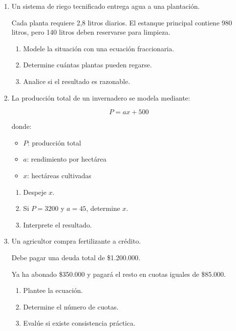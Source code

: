 \documentclass[12pt]{article}
\begin{document}
	\begin{enumerate}[label=\textbf{\arabic*.}, start=12]
		
		\item Un sistema de riego tecnificado entrega agua a una plantación.
		
		Cada planta requiere 2,8 litros diarios.
		El estanque principal contiene 980 litros,
		pero 140 litros deben reservarse para limpieza.
		
		\begin{enumerate}[label=\alph*)]
			\item Modele la situación con una ecuación fraccionaria.
			\item Determine cuántas plantas pueden regarse.
			\item Analice si el resultado es razonable.
		\end{enumerate}
		
		
		\item La producción total de un invernadero se modela mediante:
		
		\[
		P = ax + 500
		\]
		
		donde:
		
		\begin{itemize}
			\item \(P\): producción total
			\item \(a\): rendimiento por hectárea
			\item \(x\): hectáreas cultivadas
		\end{itemize}
		
		\begin{enumerate}[label=\alph*)]
			\item Despeje \(x\).
			\item Si \(P=3200\) y \(a=45\), determine \(x\).
			\item Interprete el resultado.
		\end{enumerate}
		
		
		\item Un agricultor compra fertilizante a crédito.
		
		Debe pagar una deuda total de \$1.200.000.
		
		Ya ha abonado \$350.000 y pagará
		el resto en cuotas iguales de \$85.000.
		
		\begin{enumerate}[label=\alph*)]
			\item Plantee la ecuación.
			\item Determine el número de cuotas.
			\item Evalúe si existe consistencia práctica.
		\end{enumerate}
		
	\end{enumerate}
	
\end{document}
